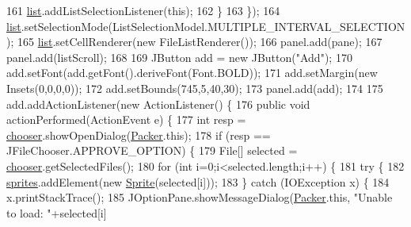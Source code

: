 \begin{DoxyCode}
161                 \mbox{\hyperlink{classorg_1_1newdawn_1_1slick_1_1tools_1_1packulike_1_1_packer_a45e8438e951eb84f2efaf06e5ae481bd}{list}}.addListSelectionListener(\textcolor{keyword}{this});
162             \}
163         \});
164         \mbox{\hyperlink{classorg_1_1newdawn_1_1slick_1_1tools_1_1packulike_1_1_packer_a45e8438e951eb84f2efaf06e5ae481bd}{list}}.setSelectionMode(ListSelectionModel.MULTIPLE\_INTERVAL\_SELECTION);
165         \mbox{\hyperlink{classorg_1_1newdawn_1_1slick_1_1tools_1_1packulike_1_1_packer_a45e8438e951eb84f2efaf06e5ae481bd}{list}}.setCellRenderer(\textcolor{keyword}{new} FileListRenderer());
166         panel.add(pane);
167         panel.add(listScroll);
168         
169         JButton add = \textcolor{keyword}{new} JButton(\textcolor{stringliteral}{"Add"});
170         add.setFont(add.getFont().deriveFont(Font.BOLD));
171         add.setMargin(\textcolor{keyword}{new} Insets(0,0,0,0));
172         add.setBounds(745,5,40,30);
173         panel.add(add);
174         
175         add.addActionListener(\textcolor{keyword}{new} ActionListener() \{
176             \textcolor{keyword}{public} \textcolor{keywordtype}{void} actionPerformed(ActionEvent e) \{
177                 \textcolor{keywordtype}{int} resp = \mbox{\hyperlink{classorg_1_1newdawn_1_1slick_1_1tools_1_1packulike_1_1_packer_aee4fbd6c801ae2b56690fc2994e73e52}{chooser}}.showOpenDialog(\mbox{\hyperlink{classorg_1_1newdawn_1_1slick_1_1tools_1_1packulike_1_1_packer_aea273a706568d7f6e6621a38d3ad694d}{Packer}}.this);
178                 \textcolor{keywordflow}{if} (resp == JFileChooser.APPROVE\_OPTION) \{
179                     File[] selected = \mbox{\hyperlink{classorg_1_1newdawn_1_1slick_1_1tools_1_1packulike_1_1_packer_aee4fbd6c801ae2b56690fc2994e73e52}{chooser}}.getSelectedFiles();
180                     \textcolor{keywordflow}{for} (\textcolor{keywordtype}{int} i=0;i<selected.length;i++) \{
181                         \textcolor{keywordflow}{try} \{
182                             \mbox{\hyperlink{classorg_1_1newdawn_1_1slick_1_1tools_1_1packulike_1_1_packer_a5684e96219ce89e574c4550d3c650eaa}{sprites}}.addElement(\textcolor{keyword}{new} \mbox{\hyperlink{class_sprite}{Sprite}}(selected[i]));
183                         \} \textcolor{keywordflow}{catch} (IOException x) \{
184                             x.printStackTrace();
185                             JOptionPane.showMessageDialog(\mbox{\hyperlink{classorg_1_1newdawn_1_1slick_1_1tools_1_1packulike_1_1_packer_aea273a706568d7f6e6621a38d3ad694d}{Packer}}.this, \textcolor{stringliteral}{"Unable to load: "}+selected[i]

\end{DoxyCode}

